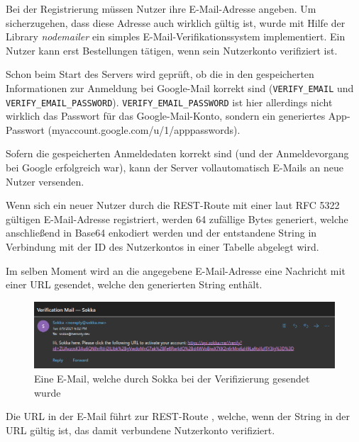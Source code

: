 Bei der Registrierung müssen Nutzer ihre E-Mail-Adresse angeben. Um sicherzugehen, dass diese Adresse auch wirklich gültig ist, wurde mit Hilfe der Library \textit{nodemailer} ein simples E-Mail-Verifikationssystem implementiert. Ein Nutzer kann erst Bestellungen tätigen, wenn sein Nutzerkonto verifiziert ist.

Schon beim Start des Servers wird geprüft, ob die in den \textit{} gespeicherten Informationen zur Anmeldung bei Google-Mail korrekt sind (\lstinline{VERIFY_EMAIL} und \lstinline{VERIFY_EMAIL_PASSWORD}). \lstinline{VERIFY_EMAIL_PASSWORD} ist hier allerdings nicht wirklich das Passwort für das Google-Mail-Konto, sondern ein generiertes App-Passwort (myaccount.google.com/u/1/apppasswords).

Sofern die gespeicherten Anmeldedaten korrekt sind (und der Anmeldevorgang bei Google erfolgreich war), kann der Server vollautomatisch E-Mails an neue Nutzer versenden.

Wenn sich ein neuer Nutzer durch die REST-Route \textit{} mit einer laut RFC 5322 gültigen E-Mail-Adresse registriert, werden 64 zufällige Bytes generiert, welche anschließend in Base64 enkodiert werden und der entstandene String in Verbindung mit der ID des Nutzerkontos in einer Tabelle abgelegt wird.

Im selben Moment wird an die angegebene E-Mail-Adresse eine Nachricht mit einer URL gesendet, welche den generierten String enthält.

\begin{figure}[htp]
    \begin{center}
        \includegraphics[width=1\textwidth]{images/Backend/mail.png}
        \caption{Eine E-Mail, welche durch Sokka bei der Verifizierung gesendet wurde}
    \end{center}
\end{figure}

Die URL in der E-Mail führt zur REST-Route \textit{}, welche, wenn der String in der URL gültig ist, das damit verbundene Nutzerkonto verifiziert.

